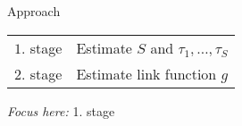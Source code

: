 \begin{frame}{Approach}

    \begin{table}[]
    \renewcommand{\arraystretch}{1.5}
        \begin{tabular}{ll}

        \textcolor{bonnblue}{$1$. stage} & Estimate $S$ and $\tau_1, \dots, \tau_S$\\
        \textcolor{bonnblue}{$2$. stage} & Estimate link function $g$

        \end{tabular}
    \end{table}

    \vspace{1cm}
    \emph{Focus here:} 1. stage

\end{frame}
